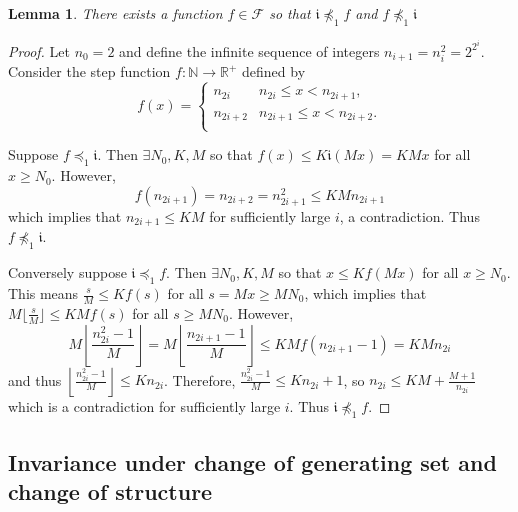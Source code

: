 \documentclass[11pt]{amsart}
\newcommand{\preceqF}{\preceq_1}
\newcommand{\npreceqF}{\npreceq_1}
\newtheorem{lemma}[theorem]{Lemma}
\theoremstyle{definition}
\newcommand\N{\mathbb N}
\newcommand\Rplus{\mathbb R^+}
\newcommand\F{\mathcal F}
\newcommand{\ii}{\mathfrak{i}}
\renewcommand{\geq}{\geqslant} \renewcommand{\leq}{\leqslant} \renewcommand{\ge}{\geqslant} \renewcommand{\le}{\leqslant}
\begin{document}
\begin{lemma}\label{lem:example-incompariable}
There exists a function $f\in  \F$  so that $\ii\npreceqF f$ and $f\npreceqF \ii$
\end{lemma}
\begin{proof}
 Let $n_0 =2$ and define the infinite sequence of integers $n_{i+1}=n_i^2 = 2^{2^i}$.
 Consider the step function $f:\N\to \Rplus$
 defined by
\[f(x)= \left\{\begin{array}{lll}
n_{2i} &n_{2i} \leq x < n_{2i+1},\\
n_{2i+2} &n_{2i+1} \leq x < n_{2i+2}.\\
\end{array}  \right.\]


Suppose $f\preceqF \ii$. Then $\exists N_0, K,M$ so that $f(x)\leq K\ii(Mx)= KMx$ for all $x\geq N_0$.
However,
\[ f(n_{2i+1})=n_{2i+2}=n_{2i+1}^2\leq KM n_{2i+1}\]
which implies that
$n_{2i+1}\leq KM $ for sufficiently large $i$, a contradiction.
Thus $f\npreceqF \ii$.

Conversely suppose $\ii\preceqF f$. Then $\exists N_0, K,M$ so that $x\leq Kf(Mx)$ for all $x\geq N_0$. This means $\frac{s}{M}\leq Kf(s)$ for all $s=Mx\geq MN_0$, which
 implies that $M\lfloor\frac{s}{M}\rfloor\leq KMf(s)$ for all $s\geq MN_0$.
However,
\[M \left\lfloor\frac{n_{2i}^2-1}{M} \right\rfloor=
M \left\lfloor \frac{n_{2i+1}-1}{M} \right\rfloor \leq KMf(n_{2i+1}-1)=KMn_{2i}
\]
and thus $\left\lfloor \frac{n_{2i}^2-1}{M} \right\rfloor \leq Kn_{2i}$.
Therefore,
$\frac{n_{2i}^2-1}{M} \leqslant K n_{2i} + 1$,
so $n_{2i} \leqslant KM + \frac{M+1}{n_{2i}}$
which is a contradiction for sufficiently large $i$.
Thus $\ii\npreceqF f$.
\end{proof}


\subsection{Invariance under change of generating set and change of structure}
\end{document}
